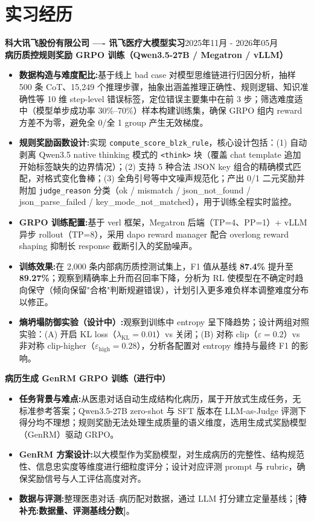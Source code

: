 \documentclass[11pt,a4paper]{article}
\newcommand{\entry}[2]{%
    \noindent\textbf{#1}\hfill{\color{textgray}#2}\\
}
\begin{document}
\section{实习经历}

\entry{科大讯飞股份有限公司 ---- 讯飞医疗大模型实习}{2025年11月 - 2026年05月}

\textbf{病历质控规则奖励 GRPO 训练（Qwen3.5-27B / Megatron / vLLM）}
\begin{itemize}
    \item \textbf{数据构造与难度配比:}基于线上 bad case 对模型思维链进行归因分析，抽样 500 条 CoT、15{,}249 个推理步骤，抽象出涵盖推理正确性、规则逻辑、知识准确性等 10 维 step-level 错误标签，定位错误主要集中在前 3 步；筛选难度适中（模型单步成功率 30\%--70\%）样本构建训练集，确保 GRPO 组内 reward 方差不为零，避免全 0/全 1 group 产生无效梯度。
    \item \textbf{规则奖励函数设计:}实现 \texttt{compute\_score\_blzk\_rule}，核心设计包括：(1) 自动剥离 Qwen3.5 native thinking 模式的 \texttt{<think>} 块（覆盖 chat template 追加开始标签缺失的边界情况）；(2) 支持 5 种合法 JSON key 组合的精确模式匹配，对格式变化鲁棒；(3) 全角引号等中文噪声规范化；产出 0/1 二元奖励并附加 \texttt{judge\_reason} 分类（ok / mismatch / json\_not\_found / json\_parse\_failed / key\_mode\_not\_matched），用于训练全程实时监控。
    \item \textbf{GRPO 训练配置:}基于 verl 框架，Megatron 后端（TP=4、PP=1）+ vLLM 异步 rollout（TP=8），采用 dapo reward manager 配合 overlong reward shaping 抑制长 response 截断引入的奖励噪声。
    \item \textbf{训练效果:}在 2{,}000 条内部病历质控测试集上，F1 值从基线 \textbf{87.4\%} 提升至 \textbf{89.27\%}；观察到精确率上升而召回率下降，分析为 RL 使模型在不确定时趋向保守（倾向保留"合格"判断规避错误），计划引入更多难负样本调整难度分布以修正。
    \item \textbf{熵坍塌防御实验（设计中）:}观察到训练中 entropy 呈下降趋势；设计两组对照实验：(A) 开启 KL loss（$\lambda_\text{KL}=0.01$）vs 关闭；(B) 对称 clip（$\varepsilon=0.2$）vs 非对称 clip-higher（$\varepsilon_\text{high}=0.28$），分析各配置对 entropy 维持与最终 F1 的影响。
\end{itemize}

\textbf{病历生成 GenRM GRPO 训练（进行中）}
\begin{itemize}
    \item \textbf{任务背景与难点:}从医患对话自动生成结构化病历，属于开放式生成任务，无标准参考答案；Qwen3.5-27B zero-shot 与 SFT 版本在 LLM-as-Judge 评测下得分均不理想；规则奖励无法处理生成质量的语义维度，选用生成式奖励模型（GenRM）驱动 GRPO。
    \item \textbf{GenRM 方案设计:}以大模型作为奖励模型，对生成病历的完整性、结构规范性、信息忠实度等维度进行细粒度评分；设计对应评测 prompt 与 rubric，确保奖励信号与人工评估高度对齐。
    \item \textbf{数据与评测:}整理医患对话--病历配对数据，通过 LLM 打分建立定量基线；\textbf{[待补充:数据量、评测基线分数]}。
\end{itemize}
\end{document}
